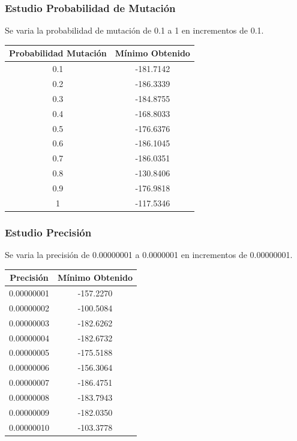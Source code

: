 \documentclass[12pt]{article}
\begin{document}
\subsubsection*{Estudio Probabilidad de Mutación}
	Se varia la probabilidad de mutación de 0.1 a 1 en incrementos de 0.1.
\begin{table}[H]
\begin{center}
\begin{tabular}{|cc|} \hline
Probabilidad Mutación & Mínimo Obtenido \\  \hline
0.1 & -181.7142 \\ 
0.2 & -186.3339 \\ 
0.3 & -184.8755 \\
0.4 & -168.8033 \\
0.5 & -176.6376 \\
0.6 & -186.1045 \\
0.7 & -186.0351 \\
0.8 & -130.8406 \\ 
0.9 & -176.9818 \\
1   & -117.5346 \\  \hline
\end{tabular}
\end{center}
\end{table}
\subsubsection*{Estudio Precisión}
	Se varia la precisión de 0.00000001 a 0.0000001 en incrementos de 0.00000001.
\begin{table}[H]
\begin{center}
\begin{tabular}{|cc|} \hline
Precisión & Mínimo Obtenido \\  \hline
0.00000001 & -157.2270 \\ 
0.00000002 & -100.5084 \\ 
0.00000003 & -182.6262 \\
0.00000004 & -182.6732 \\
0.00000005 & -175.5188 \\
0.00000006 & -156.3064 \\
0.00000007 & -186.4751 \\
0.00000008 & -183.7943 \\ 
0.00000009 & -182.0350 \\
0.00000010 & -103.3778 \\  \hline
\end{tabular}
\end{center}
\end{table}
\end{document}
